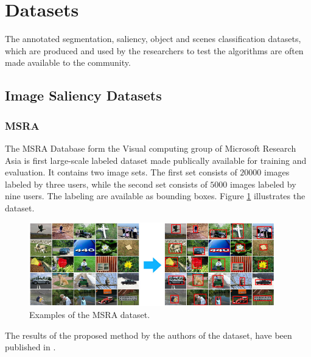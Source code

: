 \section{Datasets}
\label{sec:db}

The annotated segmentation, saliency, object and scenes classification datasets, which are produced and used by the researchers to test the algorithms are often made available to the community.

\subsection{Image Saliency Datasets}
\subsubsection{MSRA}\label{subsec:msra}
The MSRA  Database form the Visual computing group of Microsoft Research Asia \cite{msra_db} is  first large-scale labeled dataset made publically available for training and evaluation. It contains two image sets. The first set consists of $20 000$ images labeled by three users, while the second set consists of $5000$ images labeled by nine users. The labeling are available as bounding boxes. Figure \ref{fig:msra} illustrates the dataset.
\begin{figure}[H]
\begin{center}
\includegraphics[width=0.95\textwidth]{fig/MSRA}
\end{center}
\caption{Examples of the MSRA dataset.}
\label{fig:msra}
\end{figure}

The results of the proposed method by the authors of the dataset, have been published in \cite{LiuCVPR2007}.

